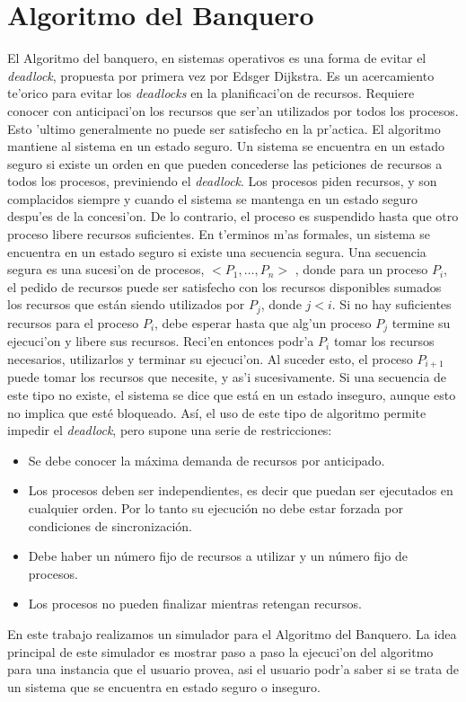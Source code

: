 \section{Algoritmo del Banquero}
El Algoritmo del banquero, en sistemas operativos es una forma de evitar el
\emph{deadlock}, propuesta por primera vez por Edsger Dijkstra. Es un
acercamiento te'orico para evitar los \emph{deadlocks} en la planificaci'on de
recursos. Requiere conocer con anticipaci'on los recursos que ser'an utilizados
por todos los procesos. Esto 'ultimo generalmente no puede ser satisfecho en la
pr'actica.
El algoritmo mantiene al sistema en un estado seguro. Un sistema se encuentra
en un estado seguro si existe un orden en que pueden concederse las peticiones
de recursos a todos los procesos, previniendo el \emph{deadlock}.
Los procesos piden recursos, y son complacidos siempre y cuando el sistema se
mantenga en un estado seguro despu'es de la concesi'on. De lo contrario, el
proceso es suspendido hasta que otro proceso libere recursos suficientes.
En t'erminos m'as formales, un sistema se encuentra en un estado seguro si
existe una secuencia segura. Una secuencia segura es una sucesi'on de procesos,
$< P_1,\ldots, P_n >$ , donde para un proceso $P_i$, el pedido de recursos
puede ser satisfecho con los recursos disponibles sumados los recursos que
están siendo utilizados por $P_j$, donde $j < i$. Si no hay suficientes
recursos para el proceso $P_i$, debe esperar hasta que alg'un proceso $P_j$
termine su ejecuci'on y libere sus recursos. Reci'en entonces podr'a $P_i$
tomar los recursos necesarios, utilizarlos y terminar su ejecuci'on. Al suceder
esto, el proceso $P_{i+1}$ puede tomar los recursos que necesite, y as'i
sucesivamente. Si una secuencia de este tipo no existe, el sistema se dice que
está en un estado inseguro, aunque esto no implica que esté bloqueado.
Así, el uso de este tipo de algoritmo permite impedir el \emph{deadlock}, pero
supone una serie de restricciones:
\begin{itemize}
 \item Se debe conocer la máxima demanda de recursos por anticipado.
 \item Los procesos deben ser independientes, es decir que puedan ser
ejecutados en cualquier orden. Por lo tanto su ejecución no debe estar forzada
por condiciones de sincronización.
 \item Debe haber un número fijo de recursos a utilizar y un número fijo de
procesos.
 \item Los procesos no pueden finalizar mientras retengan recursos.
\end{itemize}
En este trabajo realizamos un simulador para el Algoritmo del Banquero. La idea
principal de este simulador es mostrar paso a paso la ejecuci'on del algoritmo
para una instancia que el usuario provea, asi el usuario podr'a saber si se
trata de un sistema que se encuentra en estado seguro o inseguro.

